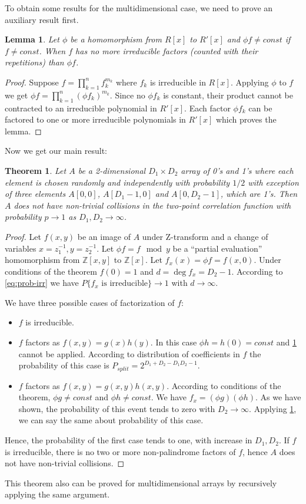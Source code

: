 \documentclass[12pt, a4paper]{article}
\newtheorem{theorem}{Theorem}
\newtheorem{lemma}{Lemma}
\begin{document}
To obtain some results for the multidimensional case, we need to prove an
auxiliary result first.
\begin{lemma}
  \label{lem:factors}
  Let $\phi$ be a homomorphism from $R[x]$ to $R'[x]$ and $\phi f \ne const$ if
  $f \ne const$. When $f$ has no more irreducible factors (counted with their
  repetitions) than $\phi f$.
\end{lemma}
\begin{proof}
  Suppose $f = \prod_{k=1}^n f_k^{m_k}$ where $f_k$ is irreducible in
  $R[x]$. Applying $\phi$ to $f$ we get $\phi f = \prod_{k=1}^n (\phi f_k)^{m_k}$.
  Since no $\phi f_k$ is constant, their product cannot be contracted to an
  irreducible polynomial in $R'[x]$. Each factor $\phi f_k$ can be factored to
  one or more irreducible polynomials in $R'[x]$ which proves the lemma.
\end{proof}

Now we get our main result:
\begin{theorem}
  Let $A$ be a 2-dimensional $D_1 \times D_2$ array of 0's and 1's where each
  element is chosen randomly and independently with probability $1/2$ with
  exception of three elements $A[0, 0]$, $A[D_1 - 1, 0]$ and $A[0, D_2 - 1]$,
  which are 1's. Then $A$ does not have non-trivial collisions in the two-point
  correlation function with probability $p \to 1$ as $D_1, D_2 \to \infty$.
\end{theorem}
\begin{proof}
  Let $f(x, y)$ be an image of $A$ under Z-transform and a change of variables
  $x = z_1^{-1}, y = z_2^{-1}$. Let $\phi f = f \mod y$ be a
  ``partial evaluation'' homomorphism from $\mathbb{Z}[x, y]$ to
  $\mathbb{Z}[x]$. Let $f_x(x) = \phi f = f(x,0)$. Under conditions of the
  theorem $f(0) = 1$ and $d = \deg f_x = D_2 - 1$.  According to
  \cref{eq:prob-irr} we have $P\{\text{$f_x$ is irreducible}\} \to 1$ with
  $d \to \infty$.

  We have three possible cases of factorization of $f$:
  \begin{itemize}
  \item $f$ is irreducible.
  \item $f$ factors as $f(x, y) = g(x)h(y)$. In this case
    $\phi h = h(0) = const$ and \cref{lem:factors} cannot be applied. According
    to distribution of coefficients in $f$ the probability of this case is
    $P_{split} = 2^{D_1 + D_2 - D_1 D_2 - 1}$.
  \item $f$ factors as $f(x, y) = g(x, y) h(x, y)$. According to conditions of
    the theorem, $\phi g \ne const$ and $\phi h \ne const$. We have
    $f_x = (\phi g) (\phi h)$. As we have shown, the probability of this event
    tends to zero with $D_2 \to \infty$. Applying \cref{lem:factors}, we can say
    the same about probability of this case.
  \end{itemize}
  Hence, the probability of the first case tends to one, with increase in
  $D_1, D_2$. If $f$ is irreducible, there is no two or more non-palindrome
  factors of $f$, hence $A$ does not have non-trivial collisions.
\end{proof}
This theorem also can be proved for multidimensional arrays by recursively
applying the same argument.
\end{document}
